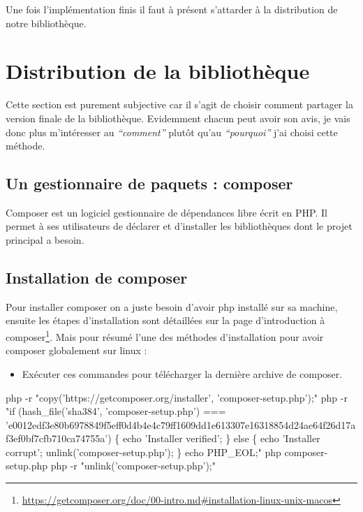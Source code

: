 \documentclass[11pt,a4paper,krantz2,11pt,oneside]{krantz}
\newenvironment{Shaded}{\begin{snugshade}}{\end{snugshade}}
\newcommand{\ExtensionTok}[1]{#1}
\newcommand{\NormalTok}[1]{#1}
\newcommand{\StringTok}[1]{\textcolor[rgb]{0.5,0.5,0.5}{#1}}
\providecommand{\tightlist}{%
  \setlength{\itemsep}{0pt}\setlength{\parskip}{0pt}}
\renewenvironment{quote}{\begin{VF}}{\end{VF}}
\renewcommand{\href}[2]{#2\footnote{\url{#1}}}
\begin{document}
Une fois l'implémentation finis il faut à présent s'attarder à la distribution de notre bibliothèque.

\hypertarget{distribution-de-la-bibliothuxe8que}{%
\section{Distribution de la bibliothèque}\label{distribution-de-la-bibliothuxe8que}}

Cette section est purement subjective car il s'agit de choisir comment partager la version finale de la bibliothèque. Evidemment chacun peut avoir son avis, je vais donc plus m'intéresser au \emph{``comment''} plutôt qu'au \emph{``pourquoi''} j'ai choisi cette méthode.

\hypertarget{un-gestionnaire-de-paquets-composer}{%
\subsection{Un gestionnaire de paquets : composer}\label{un-gestionnaire-de-paquets-composer}}

\begin{quote}
Composer est un logiciel gestionnaire de dépendances libre écrit en PHP. Il permet à ses utilisateurs de déclarer et d'installer les bibliothèques dont le projet principal a besoin.

\end{quote}

\hypertarget{install-composer}{%
\subsection{Installation de composer}\label{install-composer}}

Pour installer composer on a juste besoin d'avoir php installé sur sa machine, ensuite les étapes d'installation sont détaillées sur la page d'\href{https://getcomposer.org/doc/00-intro.md\#installation-linux-unix-macos}{introduction à composer}. Mais pour résumé l'une des méthodes d'installation pour avoir composer globalement sur linux :

\begin{itemize}
\tightlist
\item
  Exécuter ces commandes pour télécharger la dernière archive de composer.
\end{itemize}

\begin{Shaded}
\begin{Highlighting}[]
\ExtensionTok{php}\NormalTok{ -r }\StringTok{"copy('https://getcomposer.org/installer', 'composer-setup.php');"}
\ExtensionTok{php}\NormalTok{ -r }\StringTok{"if (hash_file('sha384', 'composer-setup.php') === 'e0012edf3e80b6978849f5eff0d4b4e4c79ff1609dd1e613307e16318854d24ae64f26d17af3ef0bf7cfb710ca74755a') \{ echo 'Installer verified'; \} else \{ echo 'Installer corrupt'; unlink('composer-setup.php'); \} echo PHP_EOL;"}
\ExtensionTok{php}\NormalTok{ composer-setup.php}
\ExtensionTok{php}\NormalTok{ -r }\StringTok{"unlink('composer-setup.php');"}
\end{Highlighting}
\end{Shaded}
\end{document}
